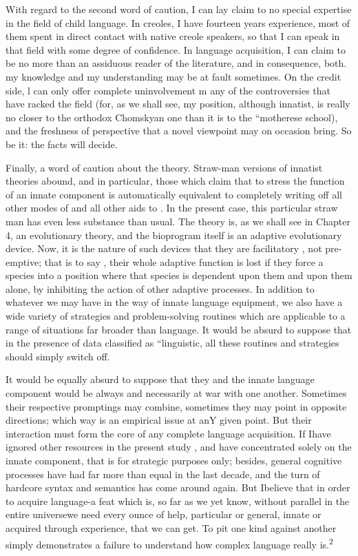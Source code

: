 With regard to the second word of caution, I can lay claim to no special expertise in the field of child language. In creoles, I have fourteen years experience, most of them spent in direct contact with native creole speakers, so that I can speak in that field with some degree of confidence. In language acquisition, I can claim to be no
 more than an assiduous reader of the literature, and in consequence, both. my knowledge and my understanding may be at fault sometimes. On the credit side, l can only offer complete uninvolvement m any of the controversies that have racked the field (for, as we shall see, my position, although innatist, is really no closer to the orthodox Chomskyan one than it is to the ``motherese school), and the freshness
of perspective that a novel viewpoint may on occasion bring. So be it: the facts will decide.

Finally, a word of caution about the theory. Straw-man versions
of innatist theories abound, and in particular, those which claim that to stress the function of an innate component  is auto\-matically equivalent to completely writing off all other modes of  and all other aids to . In the present case, this par\-ticular straw man has even less substance than usual. The  theory is, as we shall see in Chapter 4, an evolutionary theory, and the bioprogram itself is an adaptive evolutionary device. Now, it is the nature of such devices that they are facilitatory , not pre-emptive; that is to say , their whole adaptive function is lost if they force a species into a position where that species is dependent upon them and upon them alone, by inhibiting the action of other adaptive processes. In addition to whatever we may have in the way of innate language equipment, we also have a wide variety of  strategies and problem-solving routines which are applicable to a range of situations far broader than language. It would be absurd to suppose that in the presence of data classified as ``linguistic, all these routines and strategies should simply switch off.

It would be equally absurd to suppose that they and the innate language component would be always and necessarily at war with one another. Sometimes their respective promptings may combine, some\-times they may point in opposite directions; which way is an empirical issue at anY given point. But their interaction must form the core of any complete  language acquisition. If Ihave ignored
other resources in the present study , and have concentrated solely on the innate component, that is for strategic purposes only; besides, general cognitive processes have had far more than equal  in the last decade, and the turn of hardcore syntax and semantics has come around again. But Ibelieve that in order to acquire language-a feat which is, so far as we yet know, without parallel in the entire universe\-we need every ounce of help, particular or general, innate or acquired through experience, that we can get. To pit one kind against another simply demonstrates a failure to understand how complex language really is.\textsuperscript{2}

